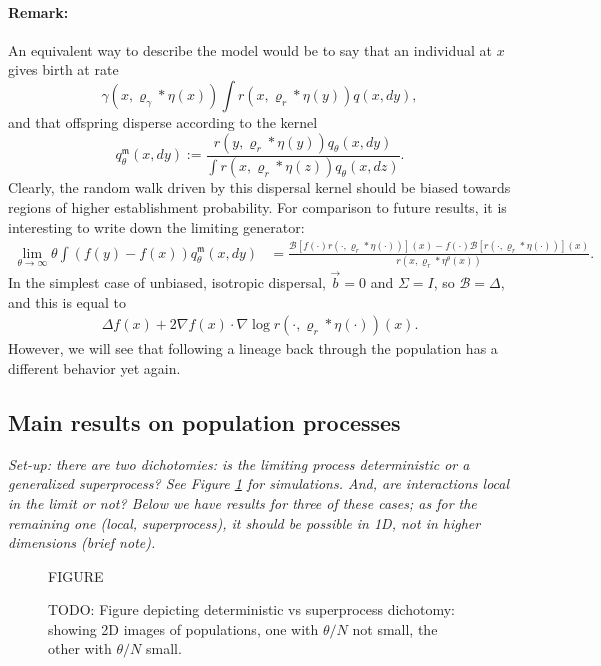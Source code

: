 \documentclass[12pt]{article}
\newcommand{\grad}{\nabla}
\newcommand{\DG}{\mathcal{B}}  %
\newcommand{\meanq}{\vec b}    %
\newcommand{\covq}{\Sigma}     %
\newcommand{\kernel}{\varrho}  %
\newcommand{\smooth}[1]{\kernel_{#1} \! * \!}  %
\newcommand{\comment}[1]{{\color{blue} \it #1}}
\begin{document}
\paragraph{Remark:}
An equivalent way to describe the model
would be to say that an individual at $x$ gives birth at rate
$$
    \gamma(x, \smooth{\gamma} \eta(x))
    \int r(x, \smooth{r} \eta(y)) q(x, dy) ,
$$
and that offspring disperse according to the kernel
$$
    q_\theta^\mathfrak{m}(x, dy)
    :=
    \frac{
        r(y, \smooth{r} \eta(y)) q_\theta(x, dy)
    }{
        \int r(x, \smooth{r} \eta(z)) q_\theta(x, dz)
    } .
$$
Clearly, the random walk driven by this dispersal kernel
should be biased towards regions of higher establishment probability.
For comparison to future results,
it is interesting to write down the limiting generator:
\begin{align*}
    \lim_{\theta \to \infty}
    \theta \int (f(y) - f(x)) q_\theta^\mathfrak{m}(x, dy)
    &=
    \frac{
        \DG\left[ f(\cdot) r(\cdot, \smooth{r} \eta(\cdot)) \right](x)
        - 
        f(\cdot) \DG\left[ r(\cdot, \smooth{r} \eta(\cdot)) \right](x)
    }{
        r(x, \smooth{r} \eta^{\theta}(x))
    } .
\end{align*}
In the simplest case of unbiased, isotropic dispersal,
$\meanq = 0$ and $\covq = I$, so $\DG = \Delta$,
and this is equal to
\begin{align*}
    \Delta f(x) + 2 \grad f(x) \cdot \grad \log r(\cdot, \smooth{r} \eta(\cdot))(x) .
\end{align*}
However, we will see that following a lineage back through the population
has a different behavior yet again.


\subsection{Main results on population processes}

\comment{
Set-up: there are two dichotomies:
is the limiting process deterministic or a generalized superprocess?
See Figure \ref{fig:super_vs_det_2d} for simulations.
And, are interactions local in the limit or not?
Below we have results for three of these cases;
as for the remaining one (local, superprocess),
it should be possible in 1D, not in higher dimensions (brief note).
}


\begin{figure}
    \begin{center}
        FIGURE
    \end{center}
    \caption{
        TODO: Figure depicting deterministic vs superprocess dichotomy:
        showing 2D images of populations,
        one with $\theta/N$ not small, the other with $\theta/N$ small.
        \label{fig:super_vs_det_2d}
    }
\end{figure}
\end{document}
